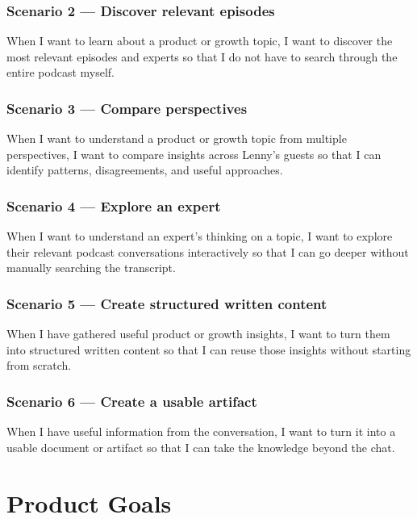 \documentclass[11pt]{article}
\begin{document}
\subsubsection{Scenario 2 — Discover relevant episodes}
When I want to learn about a product or growth topic, I want to discover the most relevant episodes and experts so that I do not have to search through the entire podcast myself.

\subsubsection{Scenario 3 — Compare perspectives}
When I want to understand a product or growth topic from multiple perspectives, I want to compare insights across Lenny's guests so that I can identify patterns, disagreements, and useful approaches.

\subsubsection{Scenario 4 — Explore an expert}
When I want to understand an expert's thinking on a topic, I want to explore their relevant podcast conversations interactively so that I can go deeper without manually searching the transcript.

\subsubsection{Scenario 5 — Create structured written content}
When I have gathered useful product or growth insights, I want to turn them into structured written content so that I can reuse those insights without starting from scratch.

\subsubsection{Scenario 6 — Create a usable artifact}
When I have useful information from the conversation, I want to turn it into a usable document or artifact so that I can take the knowledge beyond the chat.

\section{Product Goals}
\end{document}
